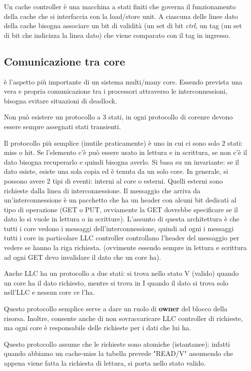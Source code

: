 \documentclass{article}
\begin{document}
Un cache controller è una macchina a stati finiti che governa il funzionamento della cache che si interfaccia con la load/store unit. A ciascuna delle linee dato della cache bisogna associare un bit di validità (un set di bit \textit{ctrl}, un tag (un set di bit che indicizza la linea dato) che viene comparato con il tag in ingresso.

\subsection{Comunicazione tra core}
è l'aspetto più importante di un sistema multi/many core. Essendo prevista una vera e propria comunicazione tra i processori attraverso le interconnessioni, bisogna evitare situazioni di deadlock.

Non può esistere un protocollo a 3 stati, in ogni protocollo di corenre devono essere sempre assegnati stati transienti.

Il protocollo più semplice (inutile praticamente) è uno in cui ci sono solo 2 stati: miss o hit. Se l'elemento c'è può essere usato in lettura e in scrittura, se non c'è il dato bisogna recuperarlo e quindi bisogna averlo. Si basa su un invariante: se il dato esiste, esiste una sola copia ed è tenuta da un solo core. In generale, si possono avere 2 tipi di eventi: interni al core o esterni. Quelli esterni sono richieste dalla linea di interconnessione. Il messaggio che arriva da un'interconnessione è un pacchetto che ha un header con alcuni bit dedicati al tipo di operazione (GET o PUT, ovviamente la GET dovrebbe specificare se il dato lo si vuole in lettura o in scritture). L'assunto di questa architettura è che tutti i core vedono i messaggi dell'interconnessione, quindi ad ogni i messaggi tutti i core in particolare LLC controller controllano l'header del messaggio per vedere se hanno la riga richiesta. (ovvimente essendo sempre in lettura e scrittura ad ogni GET devo invalidare il dato che un core ha).

Anche LLC ha un protocollo a due stati: si trova nello stato V (valido) quando un core ha il dato richiesto, mentre si trova in I quando il dato si trova solo nell'LLC e nessun core ce l'ha. 

Questo protocollo semplice serve a dare un ruolo di \textbf{owner} del blocco della risorsa. Inoltre, consente anche di non sovraccaricare LLC controller di richieste, ma ogni core è responsabile delle richieste per i dati che lui ha.


Questo protocollo assume che le richieste sono atomiche (istantanee): infatti quando abbiamo un cache-miss la tabella prevede "READ/V" assumendo che appena viene fatta la richiesta di lettura, si porta nello stato valido.
\end{document}
